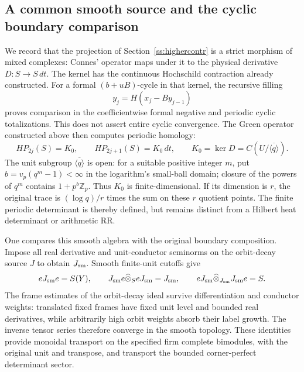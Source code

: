 \documentclass[11pt]{amsart}
\theoremstyle{definition}
\theoremstyle{remark}
\begin{document}
\subsection{A common smooth source and the cyclic boundary comparison}
We record that the projection of Section~\ref{ss:highercontr} is a strict morphism
of mixed complexes: Connes' operator maps under it to the physical
derivative $D:S\to S\,dt$. The kernel has the continuous Hochschild
contraction already constructed. For a formal $(b+uB)$-cycle in that
kernel, the recursive filling
\[
 y_j=H(x_j-By_{j-1})
\]
proves comparison in the coefficientwise formal negative and periodic
cyclic totalizations. This does not assert entire cyclic convergence.
The Green operator constructed above then computes periodic homology:
\[
 HP_{2j}(S)=K_0,\qquad HP_{2j+1}(S)=K_0\,dt,
 \qquad K_0=\ker D=C(U/\overline{\langle q\rangle}).
\]
The unit subgroup $\overline{\langle q\rangle}$ is open: for a suitable
positive integer $m$, put $b=v_p(q^m-1)<\infty$ in the logarithm's
small-ball domain; closure of the powers of $q^m$ contains
$1+p^b\mathbb Z_p$. Thus $K_0$ is finite-dimensional. If its dimension
is $r$, the original trace is $(\log q)/r$ times the sum on these
$r$ quotient points. The finite periodic determinant is thereby defined,
but remains distinct from a Hilbert heat determinant or arithmetic RR.

One compares this smooth algebra with the original boundary
composition. Impose all real derivative and unit-conductor seminorms
on the orbit-decay source $J$ to obtain $J_{\rm sm}$. Smooth finite-unit
cutoffs give
\[
 eJ_{\rm sm}e=S(Y),\qquad
 J_{\rm sm}e\widehat\otimes_S eJ_{\rm sm}=J_{\rm sm},\qquad
 eJ_{\rm sm}\widehat\otimes_{J_{\rm sm}}J_{\rm sm}e=S.
\]
The frame estimates of the orbit-decay ideal survive differentiation and conductor
weights: translated fixed frames have fixed unit level and bounded
real derivatives, while arbitrarily high orbit weights absorb their
label growth. The inverse tensor series therefore converge in the
smooth topology. These identities provide monoidal transport on the
specified firm complete bimodules, with the original unit and transpose,
and transport the bounded corner-perfect determinant sector.
\end{document}
